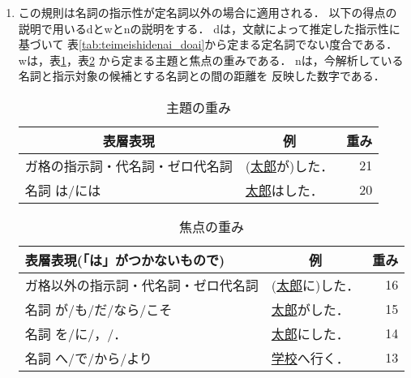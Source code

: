 {\begin{enumerate}
\item 
  \label{enum:定名詞以外探索}
  この規則は名詞の指示性が定名詞以外の場合に適用される．
  以下の得点の説明で用いるdとwとnの説明をする．
  dは，文献\cite{match}によって推定した指示性に基づいて
  表\ref{tab:teimeishidenai_doai}から定まる定名詞でない度合である．
  wは，表\ref{fig:shudai_omomi}，表\ref{fig:shouten_omomi}
  から定まる主題と焦点の重みである．
  nは，今解析している名詞と指示対象の候補とする名詞との間の距離を
  反映した数字である．

\begin{table}[t]
  \caption{主題の重み}
  \label{fig:shudai_omomi}
\begin{center}
    \newcommand{\mn}[1]{}
\begin{tabular}[c]{|l|l|r|}\hline
  \multicolumn{1}{|c|}{表層表現} & \multicolumn{1}{|c|}{例} & 重み
  \\\hline
  {ガ格の指示詞・代名詞・ゼロ代名詞} &
  (\underline{太郎}が)した．&21 \\\hline
名詞 は/には        &  \underline{太郎}はした．  &20 \\\hline
\end{tabular}
\end{center}
\end{table}

\begin{table}[t]
  \caption{焦点の重み}
  \label{fig:shouten_omomi}
\begin{center}
    \newcommand{\mn}[1]{}
\begin{tabular}[c]{|l|l|r|}\hline
\multicolumn{1}{|l|}{
{表層表現(「は」がつかないもので)}}  & \multicolumn{1}{|c|}{例}   & 重み \\\hline
{ガ格以外の指示詞・代名詞・ゼロ代名詞} & (\underline{太郎}に)した．& 16 \\\hline
{名詞 が/も/だ/なら/こそ} & \underline{太郎}がした．  & 15 \\\hline
名詞 を/に/，/．        & \underline{太郎}にした．  & 14 \\\hline
名詞 へ/で/から/より    & \underline{学校}へ行く．  & 13 \\\hline
\end{tabular}
\end{center}
\end{table}


\end{enumerate}}
